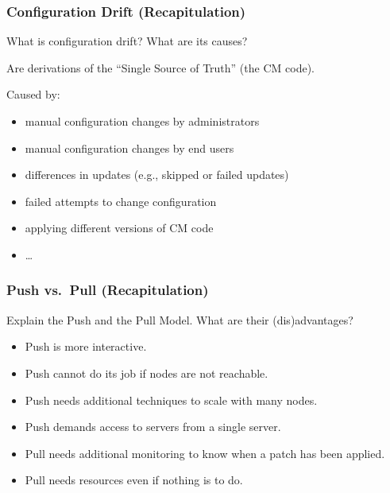 \begin{frame}
	\frametitle{Configuration Drift (Recapitulation)}

	\begin{task}
	What is configuration drift? What are its causes?
	\end{task}

	\pause

	Are derivations of the ``Single Source of Truth'' (the CM code).

	Caused by:

	\begin{itemize} %
	\item manual configuration changes by administrators
	\item manual configuration changes by end users
	\item differences in updates (e.g., skipped or failed updates)
	\item failed attempts to change configuration
	\item applying different versions of CM code
	\item \dots
	\end{itemize}


\end{frame}

\begin{frame}
	\frametitle{Push vs.\ Pull (Recapitulation)}

	\begin{task}
	Explain the Push and the Pull Model.
	What are their (dis)advantages?
	\end{task}

	\pause

	\begin{itemize} %
	\item Push is more interactive.
	\item Push cannot do its job if nodes are not reachable.
	\item Push needs additional techniques to scale with many nodes.
	\item Push demands access to servers from a single server.
	\item Pull needs additional monitoring to know when a patch has been applied.
	\item Pull needs resources even if nothing is to do.
	\end{itemize}
\end{frame}



